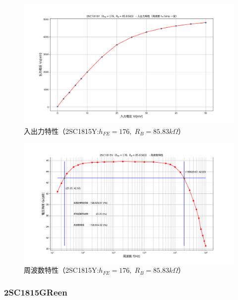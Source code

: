 \documentclass[uplatex,a4paper,11pt,oneside,openany]{jsbook}
\begin{document}
\newpage

  \begin{figure}[H]
    \centering
     \includegraphics[keepaspectratio, scale=0.48, angle=0]
                 {figs/png/iocharM1Y.png}
                 \caption{入出力特性（2SC1815Y:$h_{FE}=176,\;R_B=85.83k\Omega$）}
                 \label{fig:iocharM1Y}
 \end{figure}

 \begin{figure}[H]
    \centering
     \includegraphics[keepaspectratio, scale=0.48, angle=0]
               {figs/png/freqcharM1Y.png}
               \caption{周波数特性（2SC1815Y:$h_{FE}=176,\;R_B=85.83k\Omega$）}
               \label{fig:freqcharM1Y}
 \end{figure}

\newpage

\subsubsection{2SC1815GReen}
\end{document}
